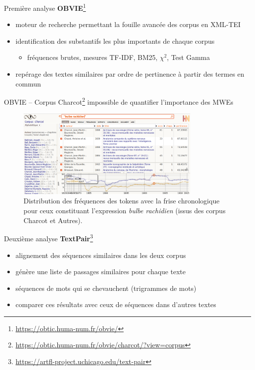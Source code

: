 \begin{frame}{Première analyse}
\textbf{OBVIE}\footnote{\url{https://obtic.huma-num.fr/obvie/}}
\begin{itemize}
    \item moteur de recherche permettant la fouille avancée des corpus en \textsc{XML-TEI}
    \item identification des substantifs les plus importants de chaque corpus 
    \begin{itemize}
        \item fréquences brutes, mesures \textsc{TF-IDF}, \textsc{BM25}, $\chi^2$, Test Gamma
    \end{itemize}
    \item repérage des textes similaires par ordre de pertinence à partir des termes en commun
\end{itemize}
    
\end{frame}
\begin{frame}{OBVIE -- Corpus Charcot\footnote{\url{https://obtic.huma-num.fr/obvie/charcot/?view=corpus}}}
\danger impossible de quantifier l'importance des MWEs
\begin{figure}[!h]
    \centering
\includegraphics[width=90mm,scale=0.5]{pic/bulbe_rachidien.png}
    \caption{Distribution des fréquences des tokens avec la frise chronologique pour ceux constituant l'expression \textit{bulbe rachidien} (issus des corpus \og{}Charcot\fg{} et \og{}Autres\fg{}).}
    \label{fig:my_label}
\end{figure}
\end{frame}

\begin{frame}{Deuxième analyse}
    \textbf{TextPair}\footnote{\url{https://artfl-project.uchicago.edu/text-pair}}
    \begin{itemize}
        \item alignement des séquences similaires dans les deux corpus
        \item génère une liste de passages similaires pour chaque texte
        \item séquences de mots qui se chevauchent (trigrammes de mots)
        \item comparer ces résultats avec ceux de séquences dans d’autres textes
    \end{itemize}
\end{frame}

